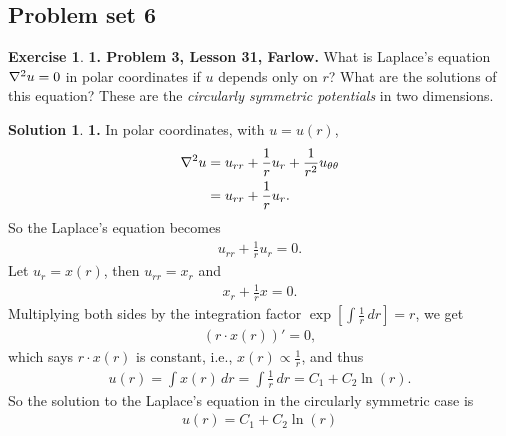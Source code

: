 \documentclass{article}
\theoremstyle{definition}
\newtheorem*{exer*}{Exercise}
\newtheorem*{sln*}{Solution}
\newcommand{\f}[2]{\frac{#1}{#2}}
\newcommand{\lb}{\left[}
\newcommand{\rb}{\right]}
\begin{document}
\newpage
\subsection{Problem set 6}


\begin{exer*}\textbf{1. Problem 3, Lesson 31, Farlow.} What is Laplace's equation $\laplacian u = 0$ in polar coordinates if $u$ depends only on $r$? What are the solutions of this equation? These are the \textit{circularly symmetric potentials} in two dimensions.
	
	\begin{sln*}\textbf{1.}
		In polar coordinates, with $u = u(r)$,
		\begin{align*}
		\laplacian u &= u_{rr} + \f{1}{r}u_r + \f{1}{r^2}u_{\theta\theta}\\
		&= u_{rr} + \f{1}{r}u_r.
		\end{align*}
		So the Laplace's equation becomes
		\begin{align*}
		u_{rr} + \f{1}{r}u_r = 0.
		\end{align*}
		Let $u_r = x(r)$, then $u_{rr} = x_r$ and
		\begin{align*}
		x_r + \f{1}{r}x = 0.
		\end{align*}
		Multiplying both sides by the integration factor $\exp\lb \int \f{1}{r}\,dr \rb = r$, we get
		\begin{align*}
		(r\cdot x(r))' = 0,
		\end{align*}
		which says $r\cdot x(r)$ is constant, i.e., $x(r) \propto \f{1}{r}$, and thus
		\begin{align*}
		u(r) = \int x(r)\,dr = \int \f{1}{r}\,dr = C_1 + C_2 \ln(r).
		\end{align*}
		So the solution to the Laplace's equation in the circularly symmetric case is
		\begin{align*}
		\boxed{u(r) = C_1 + C_2 \ln(r)}
		\end{align*}
	\end{sln*}
\end{exer*}




\newpage
\end{document}

